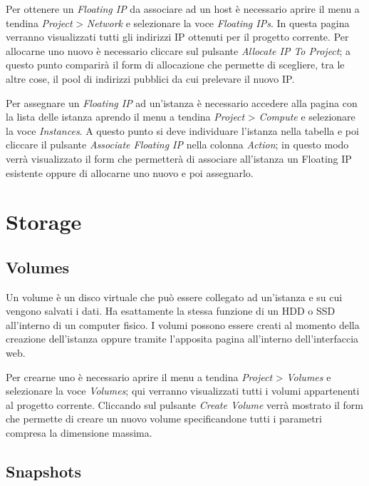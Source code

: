Per ottenere un \textit{Floating IP} da associare ad un host è necessario aprire il menu a tendina \textit{Project} > \textit{Network} e selezionare la voce \textit{Floating IPs}. In questa pagina verranno visualizzati tutti gli indirizzi IP ottenuti per il progetto corrente. Per allocarne uno nuovo è necessario cliccare sul pulsante \textit{Allocate IP To Project}; a questo punto comparirà il form di allocazione che permette di scegliere, tra le altre cose, il pool di indirizzi pubblici da cui prelevare il nuovo IP.

Per assegnare un \textit{Floating IP} ad un'istanza è necessario accedere alla pagina con la lista delle istanza aprendo il menu a tendina \textit{Project} > \textit{Compute} e selezionare la voce \textit{Instances}. A questo punto si deve individuare l'istanza nella tabella e poi cliccare il pulsante \textit{Associate Floating IP} nella colonna \emph{Action}; in questo modo verrà visualizzato il form che permetterà di associare all'istanza un Floating IP esistente oppure di allocarne uno nuovo e poi assegnarlo.



\section{Storage}

\subsection{Volumes}

Un volume è un disco virtuale che può essere collegato ad un'istanza e su cui vengono salvati i dati. Ha esattamente la stessa funzione di un HDD o SSD all'interno di un computer fisico. I volumi possono essere creati al momento della creazione dell'istanza oppure tramite l'apposita pagina all'interno dell'interfaccia web.

Per crearne uno è necessario aprire il menu a tendina \textit{Project} > \textit{Volumes} e selezionare la voce \textit{Volumes}; qui verranno visualizzati tutti i volumi appartenenti al progetto corrente. Cliccando sul pulsante \textit{Create Volume} verrà mostrato il form che permette di creare un nuovo volume specificandone tutti i parametri compresa la dimensione massima.

\subsection{Snapshots}

